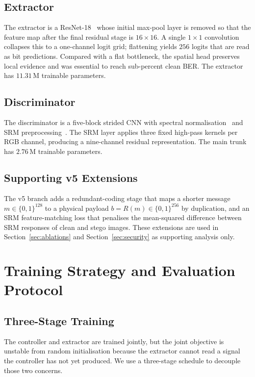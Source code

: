 \documentclass[journal]{IEEEtran}
\begin{document}
\subsection{Extractor}
The extractor is a ResNet-18~\cite{he2016deep} whose initial
max-pool layer is removed so that the feature map after the final
residual stage is $16{\times}16$. A single $1{\times}1$ convolution
collapses this to a one-channel logit grid; flattening yields $256$
logits that are read as bit predictions. Compared with a flat
bottleneck, the spatial head preserves local evidence and was
essential to reach sub-percent clean BER. The extractor has
$11.31\,\mathrm{M}$ trainable parameters.

\subsection{Discriminator}
The discriminator is a five-block strided CNN with spectral
normalisation~\cite{miyato2018spectral} and SRM
preprocessing~\cite{fridrich2012rich}. The SRM layer applies three
fixed high-pass kernels per RGB channel, producing a nine-channel
residual representation. The main trunk has $2.76\,\mathrm{M}$
trainable parameters.

\subsection{Supporting v5 Extensions}
The v5 branch adds a redundant-coding stage that maps a shorter
message $m\in\{0,1\}^{128}$ to a physical payload
$b=R(m)\in\{0,1\}^{256}$ by duplication, and an SRM feature-matching
loss that penalises the mean-squared difference between SRM
responses of clean and stego images. These extensions are used in
Section~\ref{sec:ablations} and Section~\ref{sec:security} as
supporting analysis only.

\section{Training Strategy and Evaluation Protocol}
\label{sec:training}

\subsection{Three-Stage Training}
The controller and extractor are trained jointly, but the joint
objective is unstable from random initialisation because the
extractor cannot read a signal the controller has not yet produced.
We use a three-stage schedule to decouple those two concerns.
\end{document}
